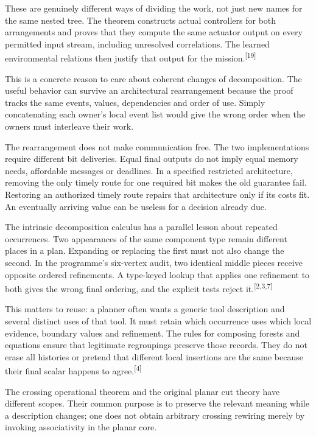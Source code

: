\documentclass[11pt]{article}
\newcommand{\sn}[1]{\textsuperscript{[#1]}}
\begin{document}
These are genuinely different ways of dividing the work, not just new names for the same nested tree. The theorem constructs actual controllers for both arrangements and proves that they compute the same actuator output on every permitted input stream, including unresolved correlations. The learned environmental relations then justify that output for the mission.\sn{19}

This is a concrete reason to care about coherent changes of decomposition. The useful behavior can survive an architectural rearrangement because the proof tracks the same events, values, dependencies and order of use. Simply concatenating each owner's local event list would give the wrong order when the owners must interleave their work.

The rearrangement does not make communication free. The two implementations require different bit deliveries. Equal final outputs do not imply equal memory needs, affordable messages or deadlines. In a specified restricted architecture, removing the only timely route for one required bit makes the old guarantee fail. Restoring an authorized timely route repairs that architecture only if its costs fit. An eventually arriving value can be useless for a decision already due.

The intrinsic decomposition calculus has a parallel lesson about repeated occurrences. Two appearances of the same component type remain different places in a plan. Expanding or replacing the first must not also change the second. In the programme's six-vertex audit, two identical middle pieces receive opposite ordered refinements. A type-keyed lookup that applies one refinement to both gives the wrong final ordering, and the explicit tests reject it.\sn{2,3,7}

This matters to reuse: a planner often wants a generic tool description and several distinct uses of that tool. It must retain which occurrence uses which local evidence, boundary values and refinement. The rules for composing forests and equations ensure that legitimate regroupings preserve those records. They do not erase all histories or pretend that different local insertions are the same because their final scalar happens to agree.\sn{4}

The crossing operational theorem and the original planar cut theory have different scopes. Their common purpose is to preserve the relevant meaning while a description changes; one does not obtain arbitrary crossing rewiring merely by invoking associativity in the planar core.
\end{document}
